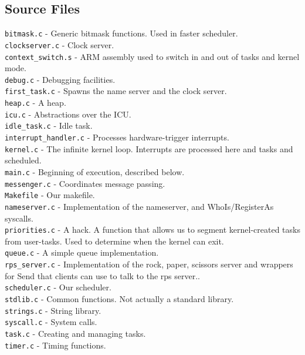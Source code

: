 \documentclass[letterpaper]{article}
\begin{document}
\subsection{Source Files}
\verb!bitmask.c! - Generic bitmask functions. Used in faster scheduler.\\
\verb!clockserver.c! - Clock server.\\
\verb!context_switch.s! - ARM assembly used to switch in and out of tasks and kernel mode.\\
\verb!debug.c! - Debugging facilities.\\
\verb!first_task.c! - Spawns the name server and the clock server.\\
\verb!heap.c! - A heap.\\
\verb!icu.c! - Abstractions over the ICU.\\
\verb!idle_task.c! - Idle task.\\
\verb!interrupt_handler.c! - Processes hardware-trigger interrupts.\\
\verb!kernel.c! - The infinite kernel loop. Interrupts are processed here and tasks and scheduled.\\
\verb!main.c! - Beginning of execution, described below.\\
\verb!messenger.c! - Coordinates message passing.\\
\verb!Makefile! - Our makefile.\\
\verb!nameserver.c! - Implementation of the nameserver, and WhoIs/RegisterAs syscalls.\\
\verb!priorities.c! - A hack. A function that allows us to segment kernel-created tasks from user-tasks. Used to determine when the kernel can exit.\\
\verb!queue.c! - A simple queue implementation.\\
\verb!rps_server.c! - Implementation of the rock, paper, scissors server and wrappers for Send that clients can use to talk to the rps server..\\
\verb!scheduler.c! - Our scheduler.\\
\verb!stdlib.c! - Common functions. Not actually a standard library.\\
\verb!strings.c! - String library.\\
\verb!syscall.c! - System calls.\\
\verb!task.c! - Creating and managing tasks.\\
\verb!timer.c! - Timing functions.\\
\end{document}
